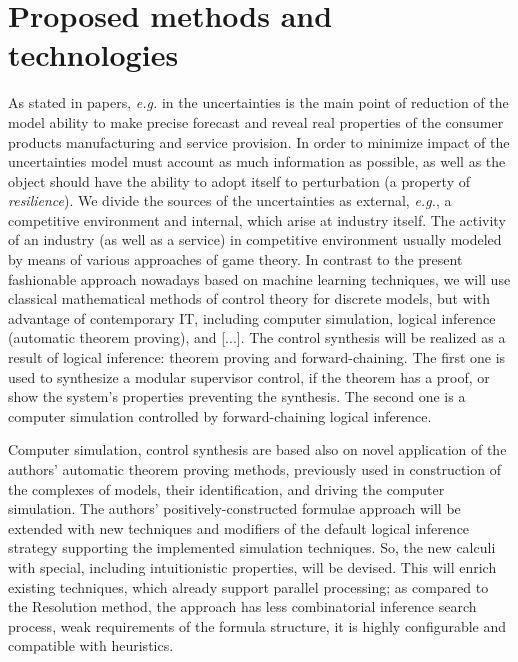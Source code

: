 \documentclass[runningheads]{llncs}
\begin{document}
\section{Proposed methods and technologies}
\label{sec:methods}


As stated in papers, \emph{e.g.} in \cite{b6} the uncertainties is the main point of reduction of the model ability to make precise forecast and reveal real properties of the consumer products manufacturing and service provision. In order to minimize impact of the uncertainties model must account as much information as possible, as well as the object should have the ability to adopt itself to perturbation (a property of \emph{resilience}). We divide the sources of the uncertainties as external, \emph{e.g.}, a competitive environment and internal, which arise at industry itself. The activity of an industry (as well as a service) in competitive environment usually modeled by means of various approaches of game theory.  In contrast to the present fashionable approach nowadays based on machine learning techniques, we will use classical mathematical methods of control theory for discrete models, but with advantage of contemporary IT, including computer simulation, logical inference (automatic theorem proving), and [...]. The control synthesis will be realized as a result of logical inference: theorem proving and forward-chaining.  The first one is used to synthesize a modular supervisor control, if the theorem has a proof, or show the system's properties preventing the synthesis.  The second one is a computer simulation controlled by forward-chaining logical inference.

Computer simulation, control synthesis are based also on novel application of the authors’ automatic theorem proving methods, previously used in construction of the complexes of models, their identification, and driving the computer simulation. The authors’ positively-constructed formulae approach will be extended with new techniques and modifiers of the default logical inference strategy supporting the implemented simulation techniques. So, the new calculi with special, including intuitionistic properties, will be devised. This will enrich existing techniques, which already support parallel processing; as compared to the Resolution method, the approach has less combinatorial inference search process, weak requirements of the formula structure, it is highly configurable and compatible with heuristics.
\end{document}
